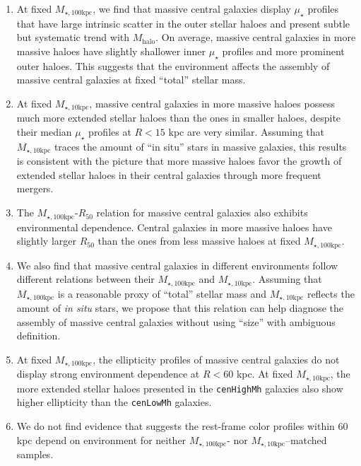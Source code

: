 \documentclass[a4paper,fleqn,usenatbib]{mnras}
\def\rbcg{\texttt{cenHighMh}}
\def\nbcg{\texttt{cenLowMh}}
\def\mhalo{{$M_{\mathrm{halo}}$}}
\def\minn{{$M_{\star,10\mathrm{kpc}}$}}
\def\mtot{{$M_{\star,100\mathrm{kpc}}$}}
\def\mden{{$\mu_{\star}$}}
\begin{document}
    \begin{enumerate}
    
        \item At fixed \mtot{}, we find that massive central galaxies display \mden{} 
            profiles that have large intrinsic scatter in the outer stellar haloes and 
            present subtle but systematic trend with \mhalo{}.
            On average, massive central galaxies in more massive haloes have slightly 
            shallower inner \mden{} profiles and more prominent outer haloes. 
            This suggests that the environment affects the assembly of massive central
            galaxies at fixed ``total'' stellar mass.
            
        \item At fixed \minn{}, massive central galaxies in more massive haloes 
            possess much more extended stellar haloes than the ones in smaller haloes, 
            despite their median \mden{} profiles at $R < 15$ kpc are very similar. 
            Assuming that \minn{} traces the amount of ``in situ'' stars in massive
            galaxies, this results is consistent with the picture that more massive 
            haloes favor the growth of extended stellar haloes in their central 
            galaxies through more frequent mergers. 
        
        \item The \mtot{}-$R_{\mathrm{50}}$ relation for massive central galaxies 
            also exhibits environmental dependence. 
            Central galaxies in more massive haloes have slightly larger
            $R_{\mathrm{50}}$ than the ones from less massive haloes at fixed \mtot{}. 
        
        \item We also find that massive central galaxies in different environments
            follow different relations between their \mtot{} and \minn{}. 
            Assuming that \mtot{} is a reasonable proxy of ``total'' stellar mass and 
            \minn{} reflects the amount of \textit{in situ} stars, we propose that 
            this relation can help diagnose the assembly of massive central galaxies 
            without using ``size'' with ambiguous definition. 
        
        \item At fixed \mtot{}, the ellipticity profiles of massive central galaxies 
            do not display strong environment dependence at $R < 60$ kpc. 
            At fixed \minn{}, the more extended stellar haloes presented in the \rbcg{}
            galaxies also show higher ellipticity than the \nbcg{} galaxies. 
        
        \item We do not find evidence that suggests the rest-frame color profiles 
            within 60 kpc depend on environment for neither \mtot{}- nor 
            \minn{}--matched samples. 
             
    \end{enumerate}
    
\end{document}
